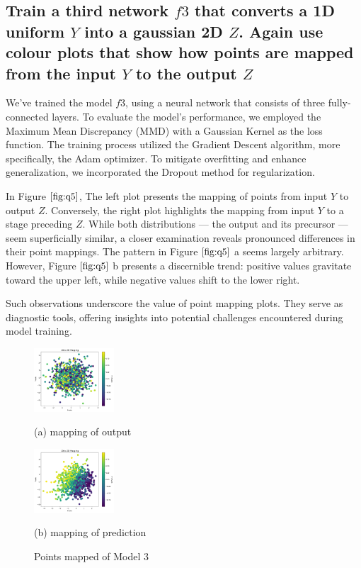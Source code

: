 \documentclass{article}
\begin{document}
\subsection{Train a third network $f3$ that converts a 1D uniform $Y$ into a gaussian
2D $Z$. Again use colour plots that show how points are mapped from
the input $Y$ to the output $Z$}
\label{ssec:q5}

We've trained the model $f3$, using a neural network that consists of three fully-connected layers. To evaluate the model's performance, we employed the Maximum Mean Discrepancy (MMD) with a Gaussian Kernel as the loss function. The training process utilized the Gradient Descent algorithm, more specifically, the Adam optimizer. To mitigate overfitting and enhance generalization, we incorporated the Dropout method for regularization.

In Figure $\ref{fig:q5}$, The left plot presents the mapping of points from input 
$Y$ to output $Z$.
Conversely, the right plot highlights the mapping from input 
$Y$ to a stage preceding $Z$.
While both distributions — the output and its precursor — seem superficially similar, a closer examination reveals pronounced differences in their point mappings. The pattern in 
Figure $\ref{fig:q5}$ a seems largely arbitrary. However, 
Figure $\ref{fig:q5}$ b presents a discernible trend: positive values gravitate toward the upper left, while negative values shift to the lower right.

Such observations underscore the value of point mapping plots. They serve as diagnostic tools, offering insights into potential challenges encountered during model training.



\begin{figure}[htb]
  \begin{minipage}[a]{.48\linewidth}
    \centering
    \centerline{\includegraphics[width=3.0cm]{images/q5_1}}
    \centerline{(a) mapping of output}\medskip
  \end{minipage}
  \hfill
  \begin{minipage}[c]{0.48\linewidth}
    \centering
    \centerline{\includegraphics[width=3.0cm]{images/q5_2}}
    \centerline{(b) mapping of prediction}\medskip
  \end{minipage}
  \caption{Points mapped of Model 3}
  \label{fig:q5}
  \end{figure}
\end{document}
